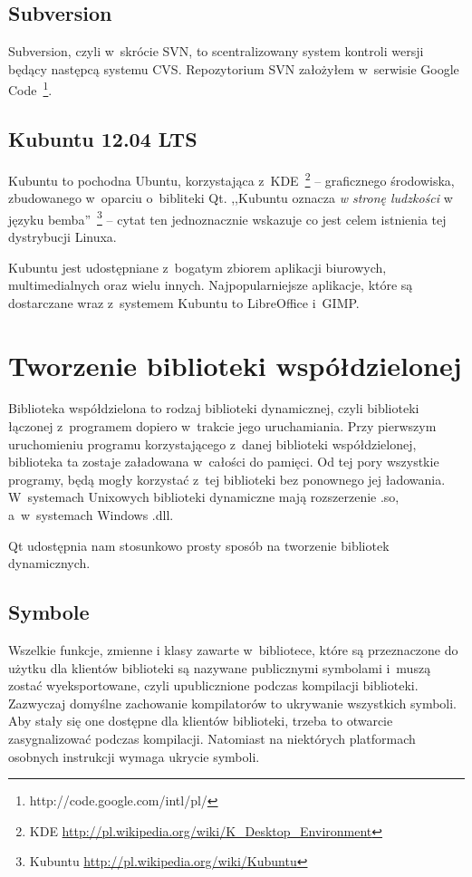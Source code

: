 \subsection{Subversion}
Subversion, czyli w~skrócie SVN, to scentralizowany system kontroli wersji będący następcą systemu CVS. Repozytorium SVN założyłem w~serwisie Google Code~\footnote{http://code.google.com/intl/pl/}.

\subsection{Kubuntu 12.04 LTS}
Kubuntu to pochodna Ubuntu, korzystająca z~KDE~\footnote{KDE \url{http://pl.wikipedia.org/wiki/K\_Desktop\_Environment}} -- graficznego środowiska, zbudowanego w~oparciu o~bibliteki Qt. ,,Kubuntu oznacza \textit{w stronę ludzkości} w języku bemba''~\footnote{Kubuntu \url{http://pl.wikipedia.org/wiki/Kubuntu}} -- cytat ten jednoznacznie wskazuje co jest celem istnienia tej dystrybucji Linuxa.

Kubuntu jest udostępniane z~bogatym zbiorem aplikacji biurowych, multimedialnych oraz wielu innych. Najpopularniejsze aplikacje, które są dostarczane wraz z~systemem Kubuntu to LibreOffice i~GIMP. 

\section{Tworzenie biblioteki współdzielonej}
Biblioteka współdzielona to rodzaj biblioteki dynamicznej, czyli biblioteki łączonej z~programem dopiero w~trakcie jego uruchamiania. Przy pierwszym uruchomieniu programu korzystającego z~danej biblioteki współdzielonej, biblioteka ta zostaje załadowana w~całości do pamięci. Od tej pory wszystkie programy, będą mogły korzystać z~tej biblioteki bez ponownego jej ładowania. W~systemach Unixowych biblioteki dynamiczne mają rozszerzenie .so, a~w~systemach Windows .dll.

Qt udostępnia nam stosunkowo prosty sposób na tworzenie bibliotek dynamicznych.

\subsection{Symbole}
Wszelkie funkcje, zmienne i klasy zawarte w~bibliotece, które są przeznaczone do użytku dla klientów biblioteki są nazywane publicznymi symbolami i~muszą zostać wyeksportowane, czyli upublicznione podczas kompilacji biblioteki. Zazwyczaj domyślne zachowanie kompilatorów to ukrywanie wszystkich symboli. Aby stały się one dostępne dla klientów biblioteki, trzeba to otwarcie zasygnalizować podczas kompilacji. Natomiast na niektórych platformach osobnych instrukcji wymaga ukrycie symboli.

